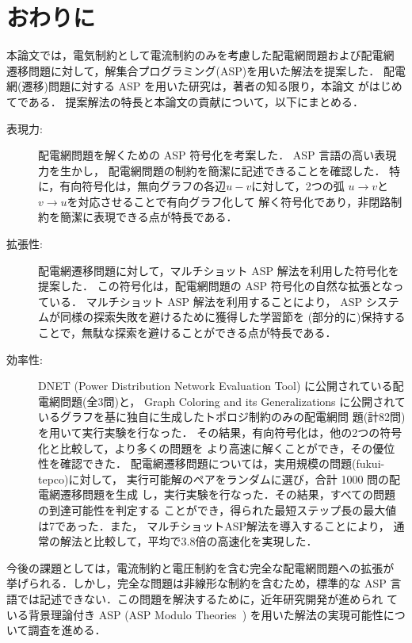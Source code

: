 ﻿\chapter{おわりに}\label{chap:conc}

本論文では，電気制約として電流制約のみを考慮した配電網問題および配電網
遷移問題に対して，解集合プログラミング(ASP)を用いた解法を提案した．
配電網(遷移)問題に対する ASP を用いた研究は，著者の知る限り，本論文
がはじめてである．
提案解法の特長と本論文の貢献について，以下にまとめる．

\begin{description}
\item[表現力:]
  配電網問題を解くための ASP 符号化を考案した．
  ASP 言語の高い表現力を生かし，
  配電網問題の制約を簡潔に記述できることを確認した．
  特に，有向符号化は，無向グラフの各辺$u-v$に対して，2つの弧
  $u\rightarrow v$と$v\rightarrow u$を対応させることで有向グラフ化して
  解く符号化であり，非閉路制約を簡潔に表現できる点が特長である．
\item[拡張性:]
  配電網遷移問題に対して，マルチショット ASP 解法を利用した符号化を提案した．
  この符号化は，配電網問題の ASP 符号化の自然な拡張となっている．
  マルチショット ASP 解法を利用することにより，
  ASP システムが同様の探索失敗を避けるために獲得した学習節を
  (部分的に)保持することで，無駄な探索を避けることができる点が特長である．
\item[効率性:]
  DNET (Power Distribution Network Evaluation Tool)
  に公開されている配電網問題(全3問)と，
  Graph Coloring and its Generalizations
  に公開されているグラフを基に独自に生成したトポロジ制約のみの配電網問
  題(計82問)を用いて実行実験を行なった．
  その結果，有向符号化は，他の2つの符号化と比較して，より多くの問題を
  より高速に解くことができ，その優位性を確認できた．
  配電網遷移問題については，実用規模の問題({\sf fukui-tepco})に対して，
  実行可能解のペアをランダムに選び，合計 1000 問の配電網遷移問題を生成
  し，実行実験を行なった．その結果，すべての問題の到達可能性を判定する
  ことができ，得られた最短ステップ長の最大値は7であった．また，
  マルチショットASP解法を導入することにより，
  通常の解法と比較して，平均で3.8倍の高速化を実現した．
\end{description}

今後の課題としては，電流制約と電圧制約を含む完全な配電網問題への拡張が
挙げられる．しかし，完全な問題は非線形な制約を含むため，標準的な ASP
言語では記述できない．この問題を解決するために，近年研究開発が進められ
ている背景理論付き ASP (ASP Modulo Theories~\cite{DBLP:conf/iclp/GebserKKOSW16}) 
を用いた解法の実現可能性について調査を進める．

